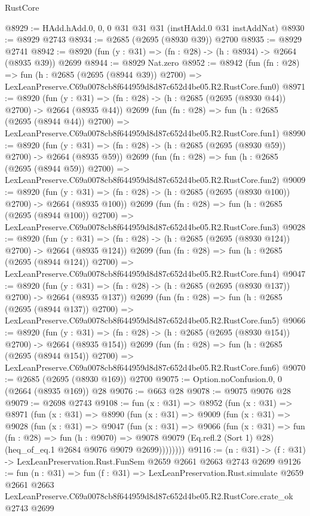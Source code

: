 \begin{lexlean}{RustCore}
\begin{coremodule}
@8929 := HAdd.hAdd.{0, 0, 0} @31 @31 @31 (instHAdd.{0} @31 instAddNat)
@8930 := @8929 @2743
@8934 := @2685 (@2695 (@8930 @39)) @2700
@8935 := @8929 @2741
@8942 := @8920 (fun (y : @31) => (fn : @28) -> (h : @8934) -> @2664 (@8935 @39)) @2699
@8944 := @8929 Nat.zero
@8952 := @8942
    (fun (fn : @28) =>
    fun (h : @2685 (@2695 (@8944 @39)) @2700) =>
    LexLeanPreserve.C69a0078cb8f644959d8d87c652d4be05.R2.RustCore.fun0)
@8971 := @8920
    (fun (y : @31) => (fn : @28) -> (h : @2685 (@2695 (@8930 @44)) @2700) -> @2664 (@8935 @44))
    @2699
    (fun (fn : @28) =>
    fun (h : @2685 (@2695 (@8944 @44)) @2700) =>
    LexLeanPreserve.C69a0078cb8f644959d8d87c652d4be05.R2.RustCore.fun1)
@8990 := @8920
    (fun (y : @31) => (fn : @28) -> (h : @2685 (@2695 (@8930 @59)) @2700) -> @2664 (@8935 @59))
    @2699
    (fun (fn : @28) =>
    fun (h : @2685 (@2695 (@8944 @59)) @2700) =>
    LexLeanPreserve.C69a0078cb8f644959d8d87c652d4be05.R2.RustCore.fun2)
@9009 := @8920
    (fun (y : @31) => (fn : @28) -> (h : @2685 (@2695 (@8930 @100)) @2700) -> @2664 (@8935 @100))
    @2699
    (fun (fn : @28) =>
    fun (h : @2685 (@2695 (@8944 @100)) @2700) =>
    LexLeanPreserve.C69a0078cb8f644959d8d87c652d4be05.R2.RustCore.fun3)
@9028 := @8920
    (fun (y : @31) => (fn : @28) -> (h : @2685 (@2695 (@8930 @124)) @2700) -> @2664 (@8935 @124))
    @2699
    (fun (fn : @28) =>
    fun (h : @2685 (@2695 (@8944 @124)) @2700) =>
    LexLeanPreserve.C69a0078cb8f644959d8d87c652d4be05.R2.RustCore.fun4)
@9047 := @8920
    (fun (y : @31) => (fn : @28) -> (h : @2685 (@2695 (@8930 @137)) @2700) -> @2664 (@8935 @137))
    @2699
    (fun (fn : @28) =>
    fun (h : @2685 (@2695 (@8944 @137)) @2700) =>
    LexLeanPreserve.C69a0078cb8f644959d8d87c652d4be05.R2.RustCore.fun5)
@9066 := @8920
    (fun (y : @31) => (fn : @28) -> (h : @2685 (@2695 (@8930 @154)) @2700) -> @2664 (@8935 @154))
    @2699
    (fun (fn : @28) =>
    fun (h : @2685 (@2695 (@8944 @154)) @2700) =>
    LexLeanPreserve.C69a0078cb8f644959d8d87c652d4be05.R2.RustCore.fun6)
@9070 := @2685 (@2695 (@8930 @169)) @2700
@9075 := Option.noConfusion.{0, 0} (@2664 (@8935 @169)) @28
@9076 := @663 @28
@9078 := @9075 @9076 @28
@9079 := @2698 @2743
@9108 := fun (x : @31) =>
  @8952
    (fun (x : @31) =>
    @8971
      (fun (x : @31) =>
      @8990
        (fun (x : @31) =>
        @9009
          (fun (x : @31) =>
          @9028
            (fun (x : @31) =>
            @9047
              (fun (x : @31) =>
              @9066
                (fun (x : @31) =>
                fun (fn : @28) =>
                fun (h : @9070) =>
                @9078
                  @9079
                  (Eq.refl.{2} (Sort 1) @28)
                  (heq_of_eq.{1} @2684 @9076 @9079 @2699))))))))
@9116 := (n : @31) -> (f : @31) -> LexLeanPreservation.Rust.FunSem @2659 @2661 @2663 @2743 @2699
@9126 := fun (n : @31) =>
  fun (f : @31) =>
  LexLeanPreservation.Rust.simulate
    @2659
    @2661
    @2663
    LexLeanPreserve.C69a0078cb8f644959d8d87c652d4be05.R2.RustCore.crate_ok
    @2743
    @2699
\end{coremodule}
\end{lexlean}
